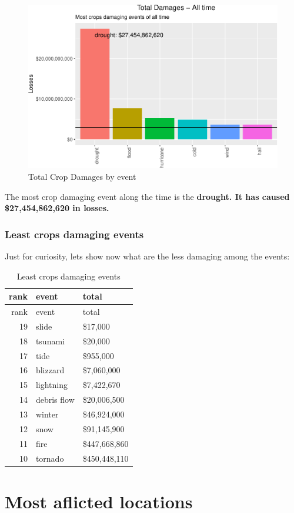 \documentclass[]{article}
\begin{document}
\begin{figure}[htbp]
\centering
\includegraphics{readme_files/figure-latex/crop-all-plot-1.pdf}
\caption{Total Crop Damages by event}
\end{figure}

The most crop damaging event along the time is the \textbf{drought. It
has caused \$27,454,862,620 in losses.}

\subsubsection{Least crops damaging
events}\label{least-crops-damaging-events}

Just for curiosity, lets show now what are the less damaging among the
events:

\begin{longtable}[]{@{}rll@{}}
\caption{Least crops damaging events}\tabularnewline
\toprule
rank & event & total\tabularnewline
\midrule
\endfirsthead
\toprule
rank & event & total\tabularnewline
\midrule
\endhead
19 & slide & \$17,000\tabularnewline
18 & tsunami & \$20,000\tabularnewline
17 & tide & \$955,000\tabularnewline
16 & blizzard & \$7,060,000\tabularnewline
15 & lightning & \$7,422,670\tabularnewline
14 & debris flow & \$20,006,500\tabularnewline
13 & winter & \$46,924,000\tabularnewline
12 & snow & \$91,145,900\tabularnewline
11 & fire & \$447,668,860\tabularnewline
10 & tornado & \$450,448,110\tabularnewline
\bottomrule
\end{longtable}

\section{Most aflicted locations}\label{most-aflicted-locations}
\end{document}
